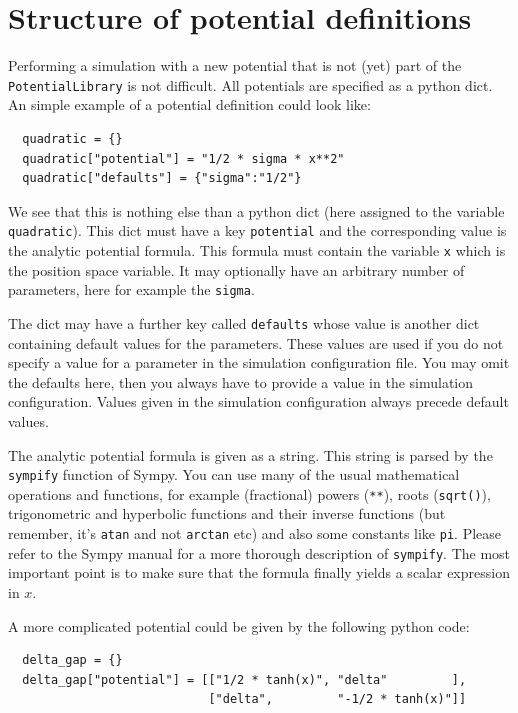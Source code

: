 \documentclass[a4paper,10pt]{report}
\begin{document}
\section{Structure of potential definitions}

Performing a simulation with a new potential that is not (yet) part of the
\texttt{PotentialLibrary} is not difficult. All potentials are specified
as a python dict. An simple example of a potential definition could look like:

\begin{verbatim}
  quadratic = {}
  quadratic["potential"] = "1/2 * sigma * x**2"
  quadratic["defaults"] = {"sigma":"1/2"}
\end{verbatim}

We see that this is nothing else than a python dict (here assigned to the
variable \texttt{quadratic}). This dict must have a key \texttt{potential}
and the corresponding value is the analytic potential formula. This formula
must contain the variable \texttt{x} which is the position space variable.
It may optionally have an arbitrary number of parameters, here for example
the \texttt{sigma}.

The dict may have a further key called \texttt{defaults} whose value is
another dict containing default values for the parameters. These values
are used if you do not specify a value for a parameter in the simulation
configuration file. You may omit the defaults here, then you always have
to provide a value in the simulation configuration. Values given in the
simulation configuration always precede default values.

The analytic potential formula is given as a string. This string is parsed
by the \texttt{sympify} function of Sympy. You can use many of the usual
mathematical operations and functions, for example (fractional) powers
(\texttt{**}), roots (\texttt{sqrt()}), trigonometric and hyperbolic functions
and their inverse functions (but remember, it's \texttt{atan} and not \texttt{arctan} etc)
and also some constants like \texttt{pi}. Please refer to the Sympy manual
for a more thorough description of \texttt{sympify}. The most important point is
to make sure that the formula finally yields a scalar expression in $x$.

\newpage
A more complicated potential could be given by the following python code:

\begin{verbatim}
  delta_gap = {}
  delta_gap["potential"] = [["1/2 * tanh(x)", "delta"         ],
                            ["delta",         "-1/2 * tanh(x)"]]
\end{verbatim}
\end{document}
